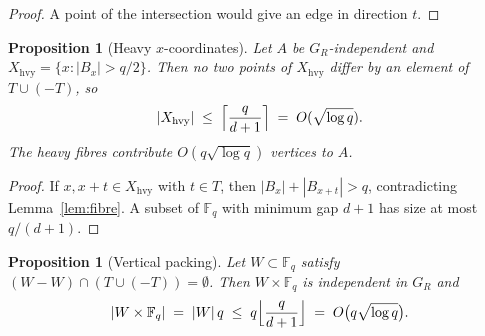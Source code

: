 \documentclass[11pt]{article}
\newtheorem{proposition}[theorem]{Proposition}
\theoremstyle{definition}
\newcommand{\F}{\mathbb{F}}
\begin{document}
\begin{proof}
A point of the intersection would give an edge in direction $t$.
\end{proof}

\begin{proposition}[Heavy $x$-coordinates]\label{prop:heavy}
Let $A$ be $G_R$-independent and $X_{\mathrm{hvy}}=\{x:|B_x|>q/2\}$.
Then no two points of $X_{\mathrm{hvy}}$ differ by an element of $T\cup(-T)$, so
\[
  |X_{\mathrm{hvy}}|\;\le\;\Bigl\lceil\frac{q}{d+1}\Bigr\rceil\;=\;O(\sqrt{\log q}).
\]
The heavy fibres contribute $O(q\sqrt{\log q})$ vertices to $A$.
\end{proposition}

\begin{proof}
If $x,x+t\in X_{\mathrm{hvy}}$ with $t\in T$, then $|B_x|+|B_{x+t}|>q$, contradicting Lemma~\ref{lem:fibre}.
A subset of $\F_q$ with minimum gap $d+1$ has size at most $q/(d+1)$.
\end{proof}

\begin{proposition}[Vertical packing]\label{prop:vertical}
Let $W\subset\F_q$ satisfy $(W-W)\cap(T\cup(-T))=\emptyset$.
Then $W\times\F_q$ is independent in $G_R$ and
\[
  |W\times\F_q|\;=\;|W|\,q\;\le\;q\Bigl\lfloor\frac{q}{d+1}\Bigr\rfloor\;=\;O\bigl(q\sqrt{\log q}\bigr).
\]
\end{proposition}
\end{document}
